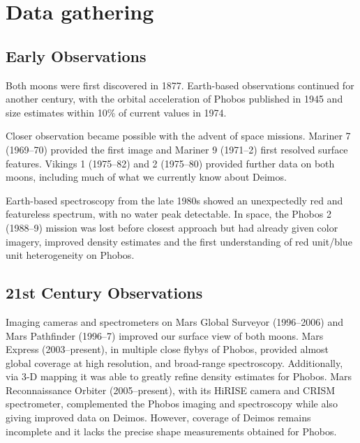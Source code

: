 \appendix
\appendixpage

\section{Data gathering}\label{appendix:obs}

\subsection{Early Observations}

Both moons were first discovered in 1877. Earth-based observations continued for another century, with the orbital acceleration of Phobos published in 1945 and size estimates within 10\% of current values in 1974.

Closer observation became possible with the advent of space missions. Mariner 7 (1969--70) provided the first image and Mariner 9 (1971--2) first resolved surface features. Vikings 1 (1975--82) and 2 (1975--80) provided further data on both moons, including much of what we currently know about Deimos. 

Earth-based spectroscopy from the late 1980s showed an unexpectedly red and featureless spectrum, with no water peak detectable. In space, the Phobos 2 (1988--9) mission was lost before closest approach but had already given color imagery, improved density estimates and the first understanding of red unit/blue unit heterogeneity on Phobos. 


\subsection{21st Century Observations}

Imaging cameras and spectrometers on Mars Global Surveyor (1996--2006) and Mars Pathfinder (1996--7) improved our surface view of both moons. Mars Express (2003--present), in multiple close flybys of Phobos, provided almost global coverage at high resolution, and broad-range spectroscopy. Additionally, via 3-D mapping it was able to greatly refine density estimates for Phobos. Mars Reconnaissance Orbiter (2005--present), with its HiRISE camera and CRISM spectrometer, complemented the Phobos imaging and spectroscopy while also giving improved data on Deimos. However, coverage of Deimos remains incomplete and it lacks the precise shape measurements obtained for Phobos.


